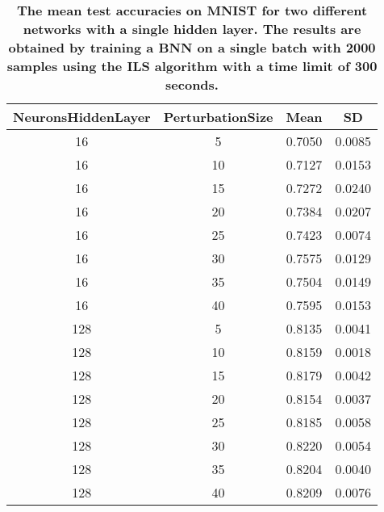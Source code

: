 \begin{center}
\begin{table}[!tb]
\centering
\begin{tabular}{|c|c|c|c|}
  \hline
NeuronsHiddenLayer & PerturbationSize & Mean & SD \\ 
  \hline
16 &     5 & 0.7050 & 0.0085 \\ 
   \hline
16 &    10 & 0.7127 & 0.0153 \\ 
   \hline
16 &    15 & 0.7272 & 0.0240 \\ 
   \hline
16 &    20 & 0.7384 & 0.0207 \\ 
   \hline
16 &    25 & 0.7423 & 0.0074 \\ 
   \hline
16 &    30 & 0.7575 & 0.0129 \\ 
   \hline
16 &    35 & 0.7504 & 0.0149 \\ 
   \hline
16 &    40 & 0.7595 & 0.0153 \\ 
   \hline
128 &     5 & 0.8135 & 0.0041 \\ 
   \hline
128 &    10 & 0.8159 & 0.0018 \\ 
   \hline
128 &    15 & 0.8179 & 0.0042 \\ 
   \hline
128 &    20 & 0.8154 & 0.0037 \\ 
   \hline
128 &    25 & 0.8185 & 0.0058 \\ 
   \hline
128 &    30 & 0.8220 & 0.0054 \\ 
   \hline
128 &    35 & 0.8204 & 0.0040 \\ 
   \hline
128 &    40 & 0.8209 & 0.0076 \\ 
   \hline
\end{tabular}
\caption{\small{\textbf{The mean test accuracies on MNIST for two different networks with a single hidden layer.
            The results are obtained by training a BNN on a single batch with 2000 samples using the ILS
            algorithm with a time limit of 300 seconds.}}} 
\label{SBT_FTPS}
\end{table}

\end{center}
